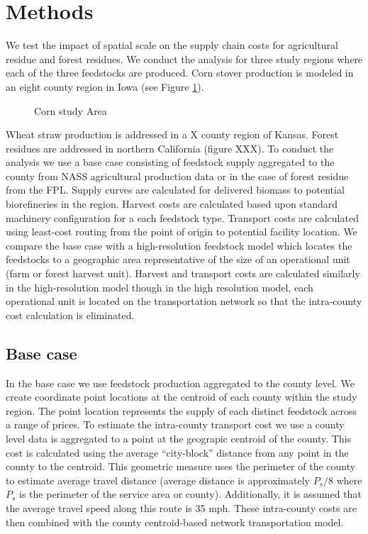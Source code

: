 \documentclass[review,3p,authoryear,times]{elsarticle}
\begin{document}
\section{Methods}
\label{sec:A1methods}
We test the impact of spatial scale on the supply chain costs for agricultural residue and forest residues. We conduct the analysis for three study regions where each of the three feedstocks are produced. Corn stover production is modeled in an eight county region in Iowa (see Figure \ref{fig:study-area}).
\begin{figure}[hpt]
  \centering
  \caption{Corn study Area}
  \label{fig:study-area}  
\end{figure} Wheat straw production is addressed in a X county region of Kansas. Forest residues are addressed in northern California (figure XXX). To conduct the analysis we use a base case consisting of feedstock supply aggregated to the county from \ac{NASS} agricultural production data or in the case of forest residue from the \ac{FPL}. Supply curves are calculated for delivered biomass to potential biorefineries in the region. Harvest costs are calculated based upon standard machinery configuration for a each feedstock type. Transport costs are calculated using least-cost routing from the point of origin to potential facility location.  We compare the base case with a high-resolution feedstock model which locates the feedstocks to a geographic area representative of the size of an operational unit (farm or forest harvest unit). Harvest and transport costs are calculated similarly in the high-resolution model though in the high resolution model, each operational unit is located on the transportation network so that the intra-county cost calculation is eliminated.

\subsection{Base case}

In the base case we use feedstock production aggregated to the county level. We create coordinate point locations at the centroid of each county within the study region. The point location represents the supply of each distinct feedstock across a range of prices. To estimate the intra-county transport cost we use a county level data is aggregated to a point at the geograpic centroid of the county. This cost is calculated using the average “city-block” distance from any point in the county to the centroid.  This geometric measure uses the perimeter of the county to estimate average travel distance (average distance is approximately $P_s/8$ where $P_s$ is the perimeter of the service area or county).  Additionally, it is assumed that the average travel speed along this route is 35 mph.  These intra-county costs are then combined with the county centroid-based network transportation model.
\end{document}

